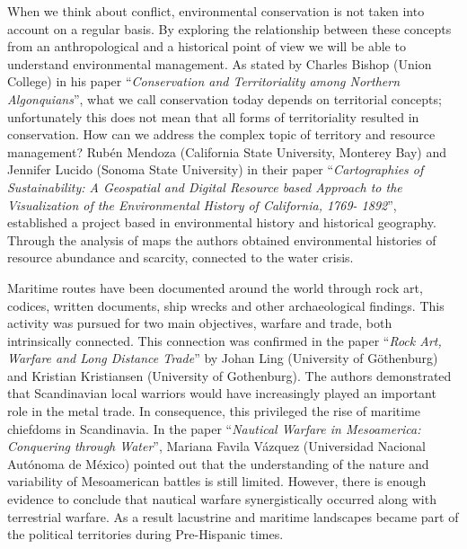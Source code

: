 
When we think about conflict, environmental conservation is not taken into account on a regular basis. By exploring the relationship between these concepts from an anthropological and a historical point of view we will be able to understand environmental management. As stated by Charles Bishop (Union College) in his paper “\emph{Conservation and Territoriality among Northern Algonquians}”, what we call conservation today depends on territorial concepts; unfortunately this does not mean that all forms of territoriality resulted in conservation. How can we address the complex topic of territory and resource management?  Rubén Mendoza (California State University, Monterey Bay) and Jennifer Lucido (Sonoma State University) in their paper “\emph{Cartographies of Sustainability: A Geospatial and Digital Resource based Approach to the Visualization of the Environmental History of California, 1769- 1892}”, established a project based in environmental history and historical geography. Through the analysis of maps the authors obtained environmental histories of resource abundance and scarcity, connected to the water crisis. 


Maritime routes have been documented around the world through rock art, codices, written documents, ship wrecks and other archaeological findings. This activity was pursued for two main objectives, warfare and trade, both intrinsically connected. This connection was confirmed in the paper “\emph{Rock Art, Warfare and Long Distance Trade}” by Johan Ling (University of Göthenburg) and Kristian Kristiansen (University of Gothenburg). The authors demonstrated that Scandinavian local warriors would have increasingly played an important role in the metal trade. In consequence, this privileged the rise of maritime chiefdoms in Scandinavia. In the paper “\emph{Nautical Warfare in Mesoamerica: Conquering through Water}”, Mariana Favila Vázquez (Universidad Nacional Autónoma de México) pointed out that the understanding of the nature and variability of Mesoamerican battles is still limited. However, there is enough evidence to conclude that nautical warfare synergistically occurred along with terrestrial warfare. As a result lacustrine and maritime landscapes became part of the political territories during Pre-Hispanic times. 

